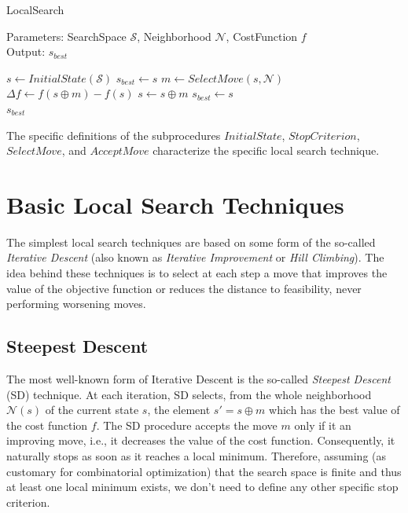 \begin{algorithm}[ht!]
    \caption{LocalSearch} \label{alg:local-search-pseudocode}   
    Parameters: SearchSpace $\mathcal{S}$, Neighborhood $\mathcal{N}$, CostFunction $f$\\   
    Output: $s_{best}$
    \begin{algorithmic}[1]
            \STATE $s \gets InitialState(\mathcal{S})$
            \STATE $s_{best} \gets s$
                \STATE $m \gets SelectMove(s,\mathcal{N})$
                \STATE $\Delta f \gets f(s \oplus m) - f(s)$
                    \STATE $s \gets s \oplus m$
                \STATE  $s_{best} \gets s$ \\
            \ENDIF
                \ENDIF
            \ENDWHILE
    \RETURN $s_{best}$
    \end{algorithmic}
\end{algorithm}

The specific definitions of the subprocedures $InitialState$, $StopCriterion$, $SelectMove$, and $AcceptMove$ characterize the specific local search technique.

\section{Basic Local Search Techniques}\label{sec:basics}

The simplest local search techniques are based on some
form of the so-called \emph{Iterative Descent} (also known as
\emph{Iterative Improvement} or \emph{Hill Climbing}).  The idea behind these 
techniques is to select at each step a move that improves the value of the objective
function or reduces the distance to feasibility, never
performing worsening moves.


\subsection{Steepest Descent}

The most well-known form of Iterative Descent is the so-called
\emph{Steepest Descent} (SD) technique. At each iteration, SD selects,
from the whole neighborhood $\mathcal{N}(s)$ of the current state
$s$, the element $s' = s \oplus m$ which has the best value of the
cost function $f$.  The SD procedure accepts the move $m$ only if it
an improving move, i.e., it decreases the value of the cost function. 
Consequently, it naturally stops as soon as it reaches a
local minimum. Therefore, assuming (as customary for combinatorial optimization) that the search space is finite and thus at least one local minimum exists, we don't need to define any other specific stop criterion.

